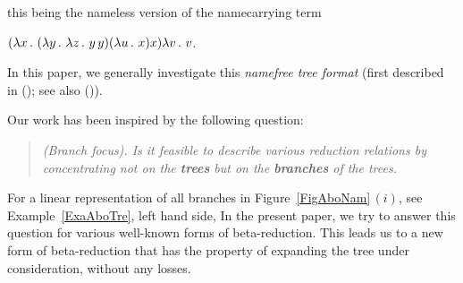 \documentclass[submission,copyright,creativecommons]{eptcs}
\begin{document}
\smallskip

\noindent this being the nameless version of the namecarrying term

\smallskip


$(\lambda x \, . \,\, (\lambda y \, . \,\, \lambda z \, . \,\, y \, y)(\lambda u \, . \,\, x)x)\lambda v \, . \,\, v$.

\smallskip

In this paper, we generally investigate this {\em namefree tree format\/} (first described in (\cite{deB72}); see also (\cite{deB77})).

\smallskip

 Our work has been inspired by the following question:

\begin{quote} {\em (Branch focus). Is it feasible to describe various reduction relations by concentrating not on the {\bf trees\/} but on the {\bf branches\/} of the trees.}
\end{quote}

\noindent For a linear representation of all branches in Figure~\ref{FigAboNam}\,$(i)$, see Example~\ref{ExaAboTre}, left hand side, 
In the present paper, we try to answer this question for various well-known forms of beta-re\-duc\-tion. This leads us to a new form of beta-reduction that has the property of expanding {\em\/} the tree under consideration, without any losses.

 

\smallskip

\end{document}
